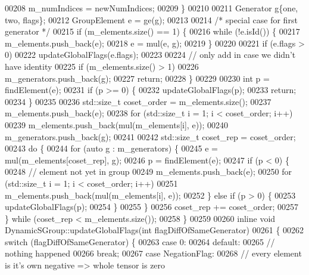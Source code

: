 \begin{DoxyCode}
00208     m\_numIndices = newNumIndices;
00209   \}
00210 
00211   Generator g\{one, two, flags\};
00212   GroupElement e = ge(g);
00213 
00214   \textcolor{comment}{/* special case for first generator */}
00215   \textcolor{keywordflow}{if} (m\_elements.size() == 1) \{
00216     \textcolor{keywordflow}{while} (!e.isId()) \{
00217       m\_elements.push\_back(e);
00218       e = mul(e, g);
00219     \}
00220 
00221     \textcolor{keywordflow}{if} (e.flags > 0)
00222       updateGlobalFlags(e.flags);
00223 
00224     \textcolor{comment}{// only add in case we didn't have identity}
00225     \textcolor{keywordflow}{if} (m\_elements.size() > 1)
00226       m\_generators.push\_back(g);
00227     \textcolor{keywordflow}{return};
00228   \}
00229 
00230   \textcolor{keywordtype}{int} p = findElement(e);
00231   \textcolor{keywordflow}{if} (p >= 0) \{
00232     updateGlobalFlags(p);
00233     \textcolor{keywordflow}{return};
00234   \}
00235 
00236   std::size\_t coset\_order = m\_elements.size();
00237   m\_elements.push\_back(e);
00238   \textcolor{keywordflow}{for} (std::size\_t i = 1; i < coset\_order; i++)
00239     m\_elements.push\_back(mul(m\_elements[i], e));
00240   m\_generators.push\_back(g);
00241 
00242   std::size\_t coset\_rep = coset\_order;
00243   \textcolor{keywordflow}{do} \{
00244     \textcolor{keywordflow}{for} (\textcolor{keyword}{auto} g : m\_generators) \{
00245       e = mul(m\_elements[coset\_rep], g);
00246       p = findElement(e);
00247       \textcolor{keywordflow}{if} (p < 0) \{
00248         \textcolor{comment}{// element not yet in group}
00249         m\_elements.push\_back(e);
00250         \textcolor{keywordflow}{for} (std::size\_t i = 1; i < coset\_order; i++)
00251           m\_elements.push\_back(mul(m\_elements[i], e));
00252       \} \textcolor{keywordflow}{else} \textcolor{keywordflow}{if} (p > 0) \{
00253         updateGlobalFlags(p);
00254       \}
00255     \}
00256     coset\_rep += coset\_order;
00257   \} \textcolor{keywordflow}{while} (coset\_rep < m\_elements.size());
00258 \}
00259 
00260 \textcolor{keyword}{inline} \textcolor{keywordtype}{void} DynamicSGroup::updateGlobalFlags(\textcolor{keywordtype}{int} flagDiffOfSameGenerator)
00261 \{
00262     \textcolor{keywordflow}{switch} (flagDiffOfSameGenerator) \{
00263       \textcolor{keywordflow}{case} 0:
00264       \textcolor{keywordflow}{default}:
00265         \textcolor{comment}{// nothing happened}
00266         \textcolor{keywordflow}{break};
00267       \textcolor{keywordflow}{case} NegationFlag:
00268         \textcolor{comment}{// every element is it's own negative => whole tensor is zero}

\end{DoxyCode}
